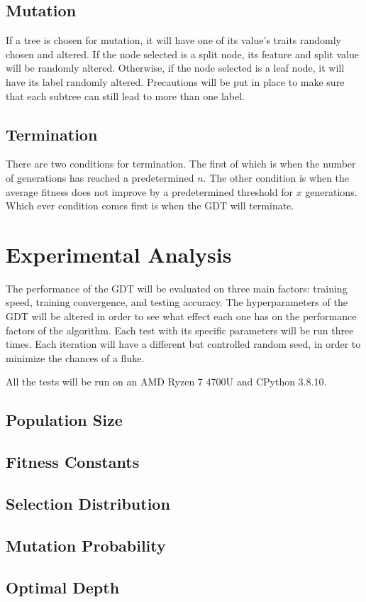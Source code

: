 \documentclass[12pt]{article}
\begin{document}
\subsection{Mutation}

If a tree is chosen for mutation, it will have one of its value's traits randomly chosen and altered. If the node selected is a split node, its feature and split value will be randomly altered. Otherwise, if the node selected is a leaf node, it will have its label randomly altered. Precautions will be put in place to make sure that each subtree can still lead to more than one label.

\subsection{Termination}

There are two conditions for termination. The first of which is when the number of generations has reached a predetermined $n$. The other condition is when the average fitness does not improve by a predetermined threshold for $x$ generations. Which ever condition comes first is when the GDT will terminate.

\section{Experimental Analysis}

The performance of the GDT will be evaluated on three main factors: training speed, training convergence, and testing accuracy. The hyperparameters of the GDT will be altered in order to see what effect each one has on the performance factors of the algorithm. Each test with its specific parameters will be run three times. Each iteration will have a different but controlled random seed, in order to minimize the chances of a fluke.

All the tests will be run on an AMD Ryzen 7 4700U and CPython 3.8.10.

\subsection{Population Size}

\subsection{Fitness Constants}

\subsection{Selection Distribution}

\subsection{Mutation Probability}

\subsection{Optimal Depth}



\end{document}

